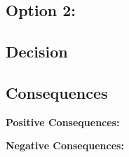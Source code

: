 \subsection*{Option 2: }

\subsection*{Decision}

\subsection*{Consequences}
\textbf{Positive Consequences:}
\begin{itemize}
\end{itemize}
\textbf{Negative Consequences:}
\begin{itemize}
\end{itemize}